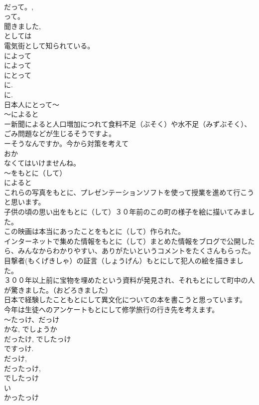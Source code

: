 \documentclass[8pt]{extreport}
\begin{document}
\begin{CJK}{UTF8}{min}
\\	だって。, 
\\	って。
\\	聞きました, 
\\	としては
\\	電気街として知られている。　
\\	によって
\\	によって
\\	にとって
\\	に. 
\\	に.
\\	日本人にとって～　　
\\	～によると
\\	ー新聞によると人口増加につれて食料不足（ぶそく）や水不足（みずぶそく）、ごみ問題などが生じるそうですよ。
\\	ーそうなんですか。今から対策を考えて
\\	おか
\\	なくてはいけませんね。
\\	～をもとに（して）
\\	によると 
\\	これらの写真をもとに、プレゼンテーションソフトを使って授業を進めて行こうと思います。
\\	子供の頃の思い出をもとに（して）３０年前のこの町の様子を絵に描いてみました。
\\	この映画は本当にあったことをもとに（して）作られた。
\\	インターネットで集めた情報をもとに（して）まとめた情報をブログで公開したら、みんなからわかりやすい、ありがたいというコメントをたくさんもらった。
\\	目撃者(もくげきしゃ）の証言（しょうげん）もとにして犯人の絵を描きました。
\\	３００年以上前に宝物を埋めたという資料が発見され、それもとにして町中の人が驚きました。（おどろきました）
\\	日本で経験したこともとにして異文化についての本を書こうと思っています。
\\	今年は生徒へのアンケートもとにして修学旅行の行き先を考えます。	
\\	～たっけ、だっけ
\\	かな, でしょうか 
\\	だったけ, でしたっけ 
\\	ですっけ.
\\	だっけ, 
\\	だったっけ, 
\\	でしたっけ
\\	い
\\	かったっけ　

\end{CJK}
\end{document}
